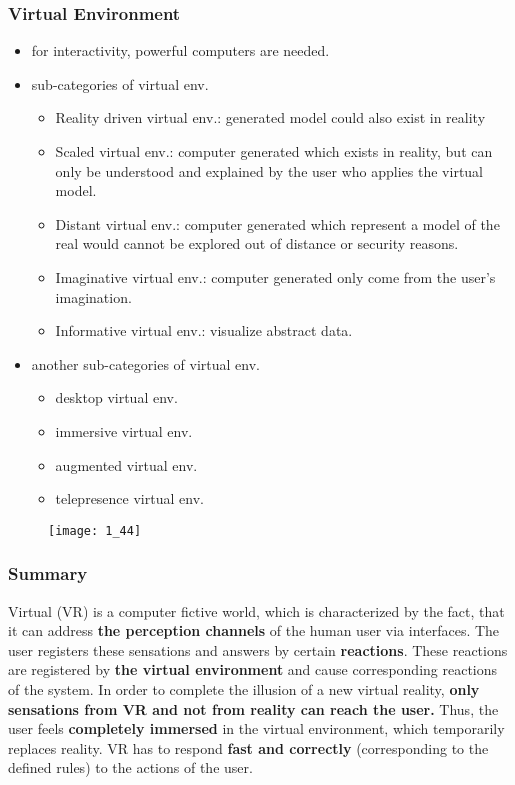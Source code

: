\documentclass{standalone}
\begin{document}
\subsubsection*{Virtual Environment}

\begin{itemize}
	\item for interactivity, powerful computers are needed.
	\item sub-categories of virtual env.
		\begin{itemize}
			\item Reality driven virtual env.: generated model could also exist in reality
			\item Scaled virtual env.: computer generated which exists in reality, but can only be understood and explained by the user who applies the virtual model.
			\item Distant virtual env.: computer generated which represent a model of the real would cannot be explored out of distance or security reasons.
			\item Imaginative virtual env.: computer generated only come from the user's imagination.
			\item Informative virtual env.: visualize abstract data.
		\end{itemize}
	\item another sub-categories of virtual env.
		\begin{itemize}
			\item desktop virtual env.
			\item immersive virtual env.
			\item augmented virtual env.
			\item telepresence virtual env.
		\end{itemize}
\end{itemize}

\begin{figure}[H]
	\centering
	\texttt{[image: 1\_44]}
\end{figure}

\subsubsection*{Summary}

Virtual (VR) is a computer fictive world, which is characterized by the fact, that it can address \textbf{the perception channels} of the human user via interfaces. The user registers these sensations and answers by certain \textbf{reactions}. These reactions are registered by \textbf{the virtual environment} and cause corresponding reactions of the system. In order to complete the illusion of a new virtual reality, \textbf{only sensations from VR and not from reality can reach the user.} Thus, the user feels \textbf{completely immersed} in the virtual environment, which temporarily replaces reality. VR has to respond \textbf{fast and correctly} (corresponding to the defined rules) to the actions of the user.
\end{document}
